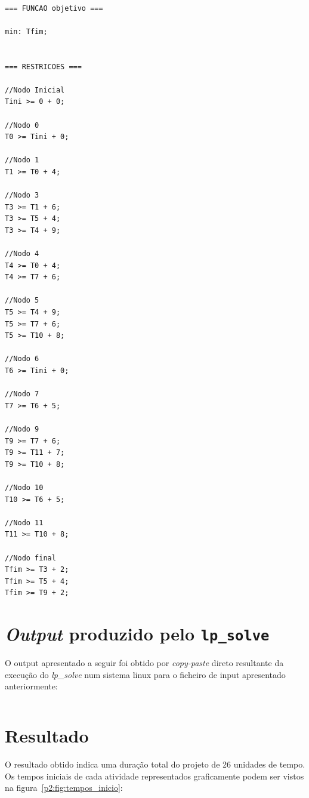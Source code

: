 \begin{verbatim}

=== FUNCAO objetivo ===

min: Tfim;


=== RESTRICOES ===

//Nodo Inicial
Tini >= 0 + 0;

//Nodo 0
T0 >= Tini + 0;

//Nodo 1
T1 >= T0 + 4;

//Nodo 3
T3 >= T1 + 6;
T3 >= T5 + 4;
T3 >= T4 + 9;

//Nodo 4
T4 >= T0 + 4;
T4 >= T7 + 6;

//Nodo 5
T5 >= T4 + 9;
T5 >= T7 + 6;
T5 >= T10 + 8;

//Nodo 6
T6 >= Tini + 0;

//Nodo 7
T7 >= T6 + 5;

//Nodo 9
T9 >= T7 + 6;
T9 >= T11 + 7;
T9 >= T10 + 8;

//Nodo 10
T10 >= T6 + 5;

//Nodo 11
T11 >= T10 + 8;

//Nodo final
Tfim >= T3 + 2;
Tfim >= T5 + 4;
Tfim >= T9 + 2;

\end{verbatim}



\newpage
\section{\emph{Output} produzido pelo \texttt{lp\_solve}}

O output apresentado a seguir foi obtido por \emph{copy-paste} direto resultante da execução do \emph{lp\_solve} num sistema linux para o ficheiro de input apresentado anteriormente:

\begin{verbatim} 

\end{verbatim}

\section{Resultado}

O resultado obtido indica uma duração total do projeto de 26 unidades de tempo.
Os tempos iniciais de cada atividade representados graficamente podem ser vistos
na figura~\ref{p2:fig:tempos_inicio}:

